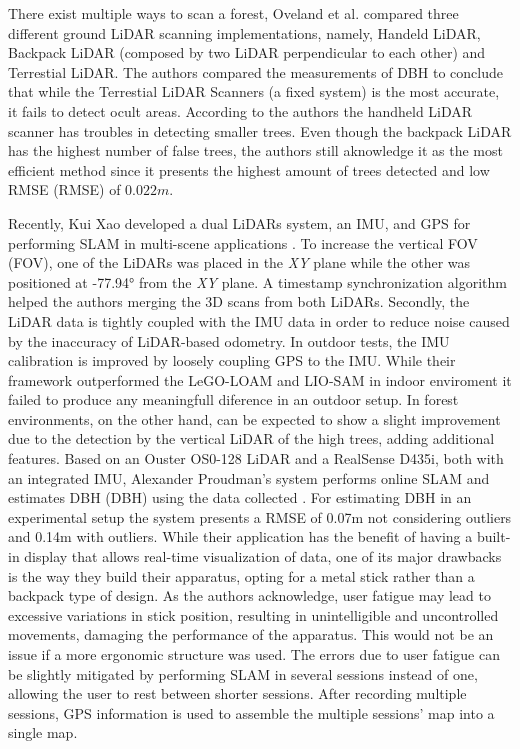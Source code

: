 There exist multiple ways to scan a forest, Oveland et al. \cite{oveland_comparing_2018} compared three different ground LiDAR scanning implementations, namely, Handeld LiDAR, Backpack LiDAR (composed by two \acs*{LiDAR} perpendicular to each other) and Terrestial LiDAR. The authors compared the measurements of \acs*{DBH} to conclude that while the Terrestial LiDAR Scanners (a fixed system) is the most accurate, it fails to detect ocult areas. According to the authors the handheld LiDAR scanner has troubles in detecting smaller trees. Even though the backpack LiDAR has the highest number of false trees, the authors still aknowledge it as the most efficient method since it presents the highest amount of trees detected and low \acl*{RMSE} (\acs*{RMSE}) of $0.022m$.

Recently, Kui Xao developed a dual \acs*{LiDAR}s system, an \acs*{IMU}, and \acs*{GPS} for performing \acs*{SLAM} in multi-scene applications \cite{xiao_high-precision_2022}. To increase the vertical \acl*{FOV} (\acs*{FOV}), one of the \acs*{LiDAR}s was placed in the \textit{XY} plane while the other was positioned at -77.94° from the \textit{XY} plane. A timestamp synchronization algorithm helped the authors merging the 3D scans from both \acs*{LiDAR}s. Secondly, the \acs*{LiDAR} data is tightly coupled with the IMU data in order to reduce noise caused by the inaccuracy of \acs*{LiDAR}-based odometry. In outdoor tests, the \acs*{IMU} calibration is improved by loosely coupling \acs*{GPS} to the \acs*{IMU}. While their framework outperformed the LeGO-LOAM and LIO-SAM in indoor enviroment it failed to produce any meaningfull diference in an outdoor setup. In forest environments, on the other hand, can be expected to show a slight improvement due to the detection by the vertical \acs*{LiDAR} of the high trees, adding additional features.
Based on an Ouster OS0-128 \acs{LiDAR} and a RealSense D435i, both with an integrated \acs{IMU}, Alexander Proudman's system performs online \acs{SLAM} and estimates \acl{DBH} (\acs*{DBH}) using the data collected \cite{proudman_online_2021}. For estimating \acs*{DBH} in an experimental setup the system presents a \acs*{RMSE} of 0.07m not considering outliers and 0.14m with outliers. While their application has the benefit of having a built-in display that allows real-time visualization of data, one of its major drawbacks is the way they build their apparatus, opting for a metal stick rather than a backpack type of design.  As the authors acknowledge, user fatigue may lead to excessive variations in stick position, resulting in unintelligible and uncontrolled movements, damaging the performance of the apparatus. This would not be an issue if a more ergonomic structure was used. The errors due to user fatigue can be slightly mitigated by performing \acs{SLAM} in several sessions instead of one, allowing the user to rest between shorter sessions. After recording multiple sessions, \acs*{GPS} information is used to assemble the multiple sessions' map into a single map.

